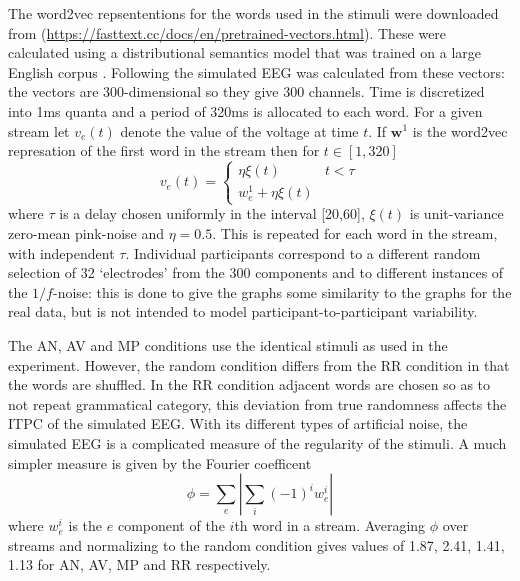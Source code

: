 \documentclass[10pt,letterpaper]{article}
\newcommand{\citet}[1]{\cite{#1}}
\begin{document}
The word2vec repsententions for the words used in the stimuli were
downloaded from
(\url{https://fasttext.cc/docs/en/pretrained-vectors.html}). These
were calculated using a distributional semantics model that was
trained on a large English corpus \citet{Bojanowski2017}. Following
\cite{FrankYang2018} the simulated EEG was calculated from these
vectors: the vectors are 300-dimensional so they give 300 channels.
Time is discretized into 1ms quanta and a period of 320ms is allocated
to each word. For a given stream let $v_e(t)$ denote the value of the
voltage at time $t$. If $\textbf{w}^1$ is the word2vec represation of
the first word in the stream then for $t\in [1,320]$
\begin{equation}
  v_e(t)=\left\{\begin{array}{ll}\eta\xi(t)&t<\tau\\ w^1_e+\eta\xi(t)\end{array}\right.
\end{equation}
where $\tau$ is a delay chosen uniformly in the interval [20,60],
$\xi(t)$ is unit-variance zero-mean pink-noise and $\eta=0.5$. This is
repeated for each word in the stream, with independent
$\tau$. Individual participants correspond to a different random
selection of 32 `electrodes' from the 300 components and to different
instances of the $1/f$-noise: this is done to give the graphs some
similarity to the graphs for the real data, but is not intended to
model participant-to-participant variability.

The AN, AV and MP conditions use the identical stimuli as used in the
experiment. However, the random condition differs from the RR
condition in that the words are shuffled. In the RR condition
adjacent words are chosen so as to not repeat grammatical category, this
deviation from true randomness affects the ITPC of the
simulated EEG. With its different types of artificial noise, the simulated
EEG is a complicated measure of the regularity of the stimuli. A much
simpler measure is given by the Fourier coefficent
\begin{equation}
  \phi= \sum_e\left|\sum_i (-1)^iw_e^i\right|
\end{equation}
where $w_e^i$ is the $e$ component of the $i$th word in a
stream. Averaging $\phi$ over streams and normalizing to the random
condition gives values of 1.87, 2.41, 1.41, 1.13 for AN, AV, MP and RR
respectively.

\end{document}

